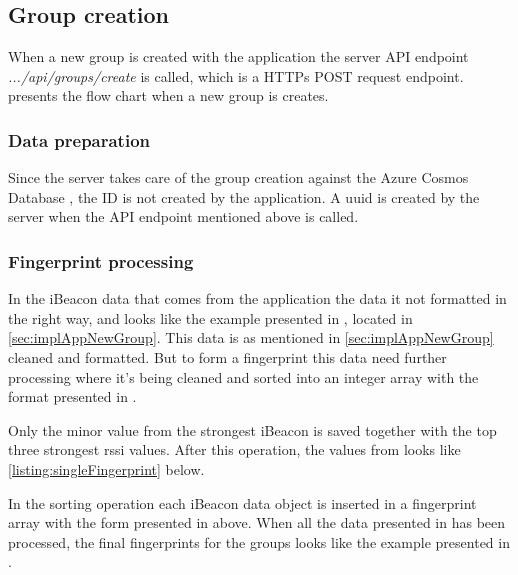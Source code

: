 \subsection{Group creation}\label{sec:implServerGroupCreation}
When a new group is created with the application the server API endpoint \textit{.../api/groups/create} is called, which is a HTTPs POST request \cite{POSTHTTPMDN} endpoint.
 presents the flow chart when a new group is creates.



\subsubsection{Data preparation}\label{sec:implServerGroupCreationDataPrep}
Since the server takes care of the group creation against the Azure Cosmos Database \cite{IntroductionAzureCosmos}, the ID is not created by the application.
A \acrfull{uuid} \cite{CommonsIdUUID} is created by the server when the API endpoint mentioned above is called.


\subsubsection{Fingerprint processing}\label{sec:implServerGroupCreationFingerprint}

In the iBeacon data that comes from the application the data it not formatted in the right way, and looks like the example presented in , located in \cref{sec:implAppNewGroup}.
This data is as mentioned in \cref{sec:implAppNewGroup} cleaned and formatted.
But to form a fingerprint this data need further processing where it's being cleaned and sorted into an integer array with the format presented in .

\bigskip

Only the minor value from the strongest iBeacon is saved together with the top three strongest \acrshort{rssi} values. After this operation, the values from  looks like \cref{listing:singleFingerprint} below.


In the sorting operation each iBeacon data object is inserted in a fingerprint array with the form presented in  above.
When all the data presented in   has been processed, the final fingerprints for the groups looks like the example presented in .

